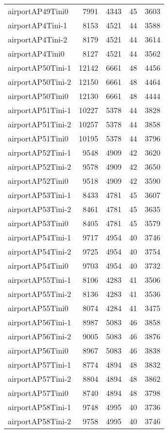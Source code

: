 \begin{longtable}{lrrrr}
airportAP49Tini0 & 7991 & 4343 & 45 & 3603 \\
airportAP4Tini-1 & 8153 & 4521 & 44 & 3588 \\
airportAP4Tini-2 & 8179 & 4521 & 44 & 3614 \\
airportAP4Tini0 & 8127 & 4521 & 44 & 3562 \\
airportAP50Tini-1 & 12142 & 6661 & 48 & 4456 \\
airportAP50Tini-2 & 12150 & 6661 & 48 & 4464 \\
airportAP50Tini0 & 12130 & 6661 & 48 & 4444 \\
airportAP51Tini-1 & 10227 & 5378 & 44 & 3828 \\
airportAP51Tini-2 & 10257 & 5378 & 44 & 3858 \\
airportAP51Tini0 & 10195 & 5378 & 44 & 3796 \\
airportAP52Tini-1 & 9548 & 4909 & 42 & 3620 \\
airportAP52Tini-2 & 9578 & 4909 & 42 & 3650 \\
airportAP52Tini0 & 9518 & 4909 & 42 & 3590 \\
airportAP53Tini-1 & 8433 & 4781 & 45 & 3607 \\
airportAP53Tini-2 & 8461 & 4781 & 45 & 3635 \\
airportAP53Tini0 & 8405 & 4781 & 45 & 3579 \\
airportAP54Tini-1 & 9717 & 4954 & 40 & 3746 \\
airportAP54Tini-2 & 9725 & 4954 & 40 & 3754 \\
airportAP54Tini0 & 9703 & 4954 & 40 & 3732 \\
airportAP55Tini-1 & 8106 & 4283 & 41 & 3506 \\
airportAP55Tini-2 & 8136 & 4283 & 41 & 3536 \\
airportAP55Tini0 & 8074 & 4284 & 41 & 3475 \\
airportAP56Tini-1 & 8987 & 5083 & 46 & 3858 \\
airportAP56Tini-2 & 9005 & 5083 & 46 & 3876 \\
airportAP56Tini0 & 8967 & 5083 & 46 & 3838 \\
airportAP57Tini-1 & 8774 & 4894 & 48 & 3832 \\
airportAP57Tini-2 & 8804 & 4894 & 48 & 3862 \\
airportAP57Tini0 & 8740 & 4894 & 48 & 3798 \\
airportAP58Tini-1 & 9748 & 4995 & 40 & 3736 \\
airportAP58Tini-2 & 9758 & 4995 & 40 & 3746 \\

\end{longtable}
